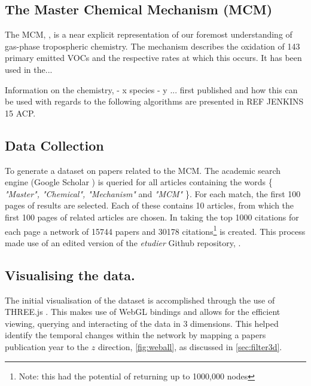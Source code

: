 \subsection{The Master Chemical Mechanism (MCM)}\label{sec:metricmcm}

The MCM, \citep{mcm}, is a near explicit representation of our foremost understanding of gas-phase tropospheric chemistry. The mechanism describes the oxidation of 143 primary emitted VOCs and the respective rates at which this occurs. It has been used in the... 



 Information on the chemistry, - x species - y ... first published and how this can be used with regards to the following algorithms are presented in REF JENKINS 15 ACP. 


\subsection{Data Collection}\label{sec:scholar}

To generate a dataset on papers related to the MCM. The academic search engine (Google Scholar \citep{scholar}) is queried for all articles containing the words \{ \emph{"Master", "Chemical", "Mechanism"} and \emph{"MCM"} \}. For each match, the first 100 pages of results are selected. Each of these contains 10 articles, from which the first 100 pages of related articles are chosen.
In taking the top 1000 citations for each page a network of 15744 papers and 30178 citations\footnote{Note: this had the potential of returning up to 1000,000 nodes} is created. This process made use of an edited version of the  \emph{etudier} Github repository, \citep{web}.


\subsection{Visualising the data.}

The initial visualisation of the dataset is accomplished through the use of THREE.js \citep{threejs}. This makes use of WebGL bindings and allows for the efficient viewing, querying and interacting of the data in 3 dimensions. This helped identify the temporal changes within the network by mapping a papers publication year to the $z$ direction, \autoref{fig:weball}, as discussed in \autoref{sec:filter3d}. 

